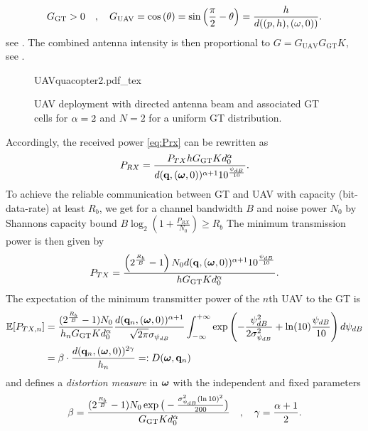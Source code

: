 \documentclass[smallabstract,smallcaptions]{dccpaper}
\newcommand{\Rb}{\ensuremath{R_b}}         %
\newcommand{\GGT}{\ensuremath{G_{\text{GT}}}}         %
\newcommand{\GUAV}{\ensuremath{G_{\text{UAV}}}}         %
\newcommand{\Dis}{\ensuremath{D}}                    %
\begin{document}
%
\begin{equation}
\GGT >0\quad,\quad
  \GUAV = \cos\left(\theta\right)=\sin\left(\frac{\pi}{2}-\theta\right)=\frac{h}{d((p,h),(\ome,0))}.
\label{eq:Gdirected}
\end{equation}
%
see \cite[pp.52]{Bal05}. The combined antenna intensity is then proportional to
%
$G=\GUAV \GGT K$, see .
%
\begin{figure}
  \centering
  \def\svgwidth{.9\textwidth} \scriptsize{
    {UAVquacopter2.pdf_tex}}
    \caption{UAV deployment with directed antenna beam and associated GT cells for $\alpha=2$ and $N=2$ for a uniform GT distribution.}
    \label{fig:uavdirected}
\end{figure}
%
Accordingly, the received power \eqref{eq:Prx} can be rewritten as
%
\begin{equation}
  P_{RX}=\frac{P_{TX}h \GGT K d^{\alpha}_0}{d(\vq,(\vome,0))^{\alpha+1}10^{\frac{\psi_{dB}}{10}}}.
\end{equation}
%
To achieve the reliable communication between GT and UAV with capacity (bit-data-rate) at least $\Rb$, we get for a channel bandwidth $B$  and noise power $N_0$ by Shannons capacity bound
$B\log_2\left(1+\frac{P_{RX}}{N_0}\right)\ge\Rb$
The minimum transmission power is then given by
%
\begin{equation}
  P_{TX}=\frac{\left(2^{\frac{\Rb}{B}}-1\right)N_0d(\vq,(\vome,0))^{\alpha+1}10^{\frac{\psi_{dB}}{10}}}{ h \GGT Kd^{\alpha}_0}.
\end{equation}
%
%
The expectation of the minimum transmitter power of the $n$th UAV to the GT is 
%
\begin{align}
  \Expect{P_{TX,n}}& =
  \frac{(2^{\frac{\Rb}{B}}-1)N_0 }{ h_n \GGT Kd^{\alpha}_0}
   \frac{d(\vq_n,(\vome,0))^{\alpha+1}}{\sqrt{2\pi}\sigma_{\psi_{dB}}} \int_{-\infty}^{+\infty}
     \exp\left(-\frac{\psi^2_{dB}}{2\sigma^2_{\psi_{dB}}}+ \ln(10) \frac{\psi_{dB}}{10}\right)d\psi_{dB}\notag\\
  &=\bet \cdot  \frac{d( \vq_n,(\vome,0))^{2\gam}}{h_n}=:\Dis(\vome,\vq_n) \label{eq:Eptx}
\end{align}
%
and defines a \emph{distortion measure} in $\boldsymbol{ \omega}$ with the independent and fixed parameters
%
\begin{align}
  \bet=\frac{(2^{\frac{\Rb}{B}}-1) N_0 \exp\big(-\frac{\sig_{\psi_{dB}}^2 (\ln 10)^2}{200}\big)}{\GGT K d_0^{\alp}}\quad,\quad
  \gam=\frac{\alp+1}{2}.
\end{align}
%
\end{document}
